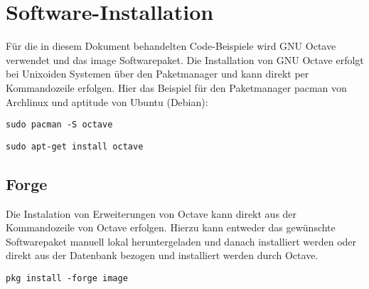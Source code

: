 \section{Software-Installation}
Für die in diesem Dokument behandelten Code-Beispiele wird GNU Octave
verwendet und das image Softwarepaket. Die Installation von GNU Octave
erfolgt bei Unixoiden Systemen über den Paketmanager und kann direkt
per Kommandozeile erfolgen. Hier das Beispiel für den Paketmanager
pacman von Archlinux und aptitude von Ubuntu (Debian):

\begin{lstlisting}
sudo pacman -S octave
\end{lstlisting}

\begin{lstlisting}
sudo apt-get install octave
\end{lstlisting}

\subsection{Forge}
Die Instalation von Erweiterungen von Octave kann direkt aus der
Kommandozeile von Octave erfolgen. Hierzu kann entweder das gewünschte
Softwarepaket manuell lokal heruntergeladen und danach installiert werden
oder direkt aus der Datenbank bezogen und installiert werden durch
Octave.

\begin{lstlisting}
pkg install -forge image
\end{lstlisting}
